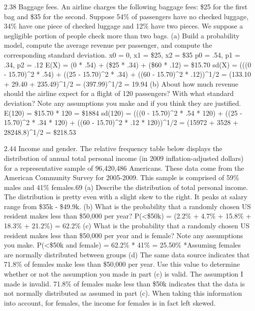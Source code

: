 \documentclass[]{article}
\begin{document}
2.38 Baggage fees. An airline charges the following baggage fees: \$25
for the first bag and \$35 for the second. Suppose 54\% of passengers
have no checked luggage, 34\% have one piece of checked luggage and 12\%
have two pieces. We suppose a negligible portion of people check more
than two bags. (a) Build a probability model, compute the average
revenue per passenger, and compute the corresponding standard deviation.
x0 = 0, x1 = \$25, x2 = \$35 p0 = .54, p1 = .34, p2 = .12 E(X) = (0 *
.54) + (\$25 * .34) + (\$60 * .12) = \$15.70 sd(X) = (((0 - 15.70)\^{}2
* .54) + ((25 - 15.70)\^{}2 * .34) + ((60 - 15.70)\^{}2 * .12))\^{}1/2 =
(133.10 + 29.40 + 235.49)\^{}1/2 = (397.99)\^{}1/2 = 19.94 (b) About how
much revenue should the airline expect for a flight of 120 passengers?
With what standard deviation? Note any assumptions you make and if you
think they are justified. E(120) = \$15.70 * 120 = \$1884 sd(120) = (((0
- 15.70)\^{}2 * .54 * 120) + ((25 - 15.70)\^{}2 * .34 * 120) + ((60 -
15.70)\^{}2 * .12 * 120))\^{}1/2 = (15972 + 3528 + 28248.8)\^{}1/2 =
\$218.53

2.44 Income and gender. The relative frequency table below displays the
distribution of annual total personal income (in 2009 inflation-adjusted
dollars) for a representative sample of 96,420,486 Americans. These data
come from the American Community Survey for 2005-2009. This sample is
comprised of 59\% males and 41\% females.69 (a) Describe the
distribution of total personal income. The distribution is pretty even
with a slight skew to the right. It peaks at salary range from \$35k -
\$49.9k. (b) What is the probability that a randomly chosen US resident
makes less than \$50,000 per year? P(\textless{}\$50k) = (2.2\% + 4.7\%
+ 15.8\% + 18.3\% + 21.2\%) = 62.2\% (c) What is the probability that a
randomly chosen US resident makes less than \$50,000 per year and is
female? Note any assumptions you make. P(\textless{}\$50k and female) =
62.2\% * 41\% = 25.50\% *Assuming females are normally distributed
between groups (d) The same data source indicates that 71.8\% of females
make less than \$50,000 per year. Use this value to determine whether or
not the assumption you made in part (c) is valid. The assumption I made
is invalid. 71.8\% of females make less than \$50k indicates that the
data is not normally distributed as assumed in part (c). When taking
this information into account, for females, the income for females is in
fact left skewed.
\end{document}
